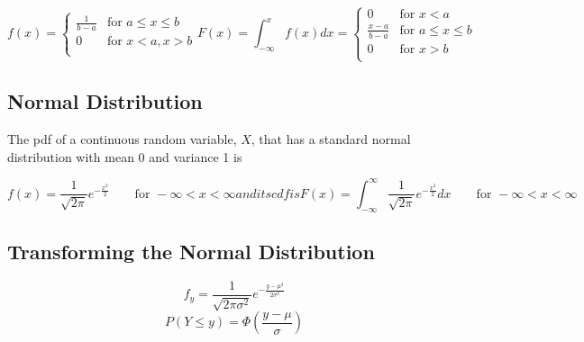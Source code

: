 \begin{subequations}
  \begin{equation}
    f(x) =  \begin{cases}
              \frac{1}{b-a} & \text{for } a \leq x \leq b \\
              0 & \text{for } x < a, x>b  \\
            \end{cases}
  \end{equation}
  \begin{equation}
    F(x) = \int^x_{-\infty}f(x)dx = \begin{cases}
                                      0 & \text{for } x < a \\
                                      \frac{x-a}{b-a} & \text{for } a \leq x \leq b \\
                                      0 & \text{for } x > b \\
                                    \end{cases}
  \end{equation}
\end{subequations}


\subsection{Normal Distribution} %
\label{sub:normal_distribution}
The pdf of a continuous random variable, $X$, that has a standard normal distribution with mean 0 and variance 1 is

\begin{subequations}
\begin{equation}
  f(x) = \frac{1}{\sqrt{2\pi}}e^{-\frac{x^2}{2}} \qquad \text{for }  -\infty < x <\infty
\end{equation}
and its cdf is
\begin{equation}
  F(x) = \int^\infty_{-\infty}\frac{1}{\sqrt{2\pi}}e^{-\frac{x^2}{2}}dx \qquad \text{for }  -\infty < x <\infty
\end{equation}
\end{subequations}


\subsection{Transforming the Normal Distribution} %
\label{sub:transformation_of_the_normal_distribution}

\begin{equation}
  f_y = \frac{1}{\sqrt{2\pi\sigma^2}}e^{-\frac{y-\mu^2}{2\sigma^2}}
\end{equation}
\begin{equation}
  P(Y \leq y) = \Phi (\frac{y - \mu}{\sigma}) 
\end{equation}


